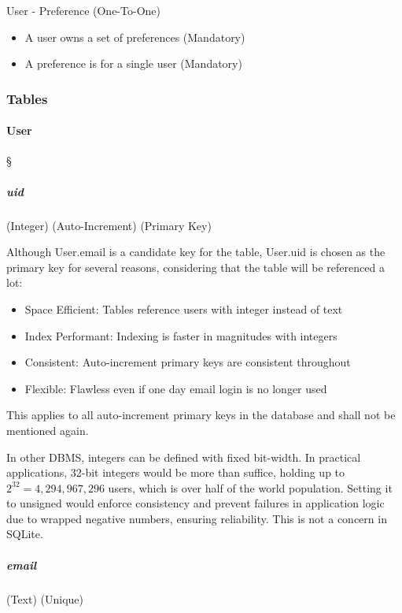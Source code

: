 User - Preference (One-To-One) \textdagger{}
\begin{itemize}
	\item A user owns a set of preferences (Mandatory)

	\item A preference is for a single user (Mandatory)
\end{itemize}

\subsubsection{Tables}
\label{data-layer.design.user.tables}

\paragraph{User}
\S{}

\subparagraph{uid}
(Integer) (Auto-Increment) (Primary Key)

Although User.email is a candidate key for the table, User.uid is chosen as the primary
key for several reasons, considering that the table will be referenced a lot:

\begin{itemize}
	\item Space Efficient: Tables reference users with integer instead of text

	\item Index Performant: Indexing is faster in magnitudes with integers

	\item Consistent: Auto-increment primary keys are consistent throughout

	\item Flexible: Flawless even if one day email login is no longer used
\end{itemize}

This applies to all auto-increment primary keys in the database and shall not be
mentioned again.

\textdagger{} In other DBMS, integers can be defined with fixed bit-width. In
practical applications, 32-bit integers would be more than suffice, holding up
to $2^{32}=4 ,294,967,296$ users, which is over half of the world population.
Setting it to unsigned would enforce consistency and prevent failures in
application logic due to wrapped negative numbers, ensuring reliability. This is
not a concern in SQLite.

\subparagraph{email}
(Text) (Unique)


